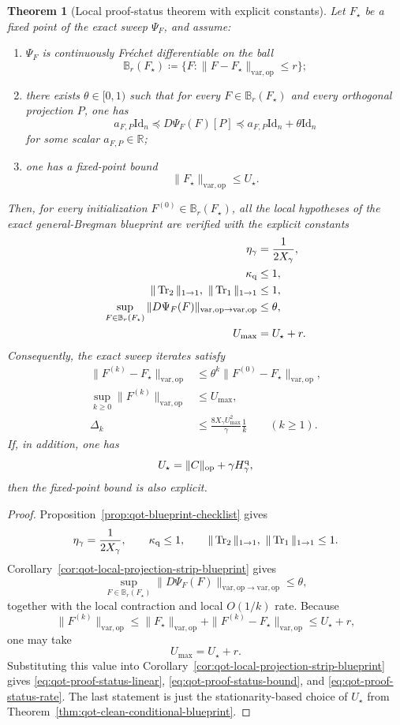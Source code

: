 \documentclass[11pt]{article}
\newcommand{\RR}{\mathbb{R}}
\newcommand{\Id}{\mathrm{Id}}
\newcommand{\Trone}{\operatorname{Tr}_{1}}
\newcommand{\Trtwo}{\operatorname{Tr}_{2}}
\newcommand{\eqdef}{\coloneqq}
\newcommand{\op}{\mathrm{op}}
\newcommand{\varop}{\mathrm{var},\op}
\theoremstyle{plain}
\newtheorem{theorem}{Theorem}[section]
\begin{document}
\begin{theorem}[Local proof-status theorem with explicit constants]
\label{thm:qot-local-proof-status}
Let $F_\star$ be a fixed point of the exact sweep $\Psi_F$, and assume:
\begin{enumerate}[label=\textnormal{(\roman*)}]
\item $\Psi_F$ is continuously Fr\'echet differentiable on the ball
\[
\mathbb B_r(F_\star)
\eqdef
\{F : \|F-F_\star\|_{\varop}\le r\};
\]
\item there exists $\theta\in[0,1)$ such that for every $F\in \mathbb B_r(F_\star)$ and every orthogonal projection $P$, one has
\[
a_{F,P}\Id_n
\preceq
D\Psi_F(F)[P]
\preceq
a_{F,P}\Id_n+\theta \Id_n
\]
for some scalar $a_{F,P}\in\RR$;
\item one has a fixed-point bound
\[
\|F_\star\|_{\varop}\le U_\star.
\]
\end{enumerate}
Then, for every initialization $F^{(0)}\in \mathbb B_r(F_\star)$, all the local hypotheses of the exact general-Bregman blueprint are verified with the explicit constants
\begin{align*}
\eta_\gamma &= \frac{1}{2X_\gamma},\\
\kappa_{\rm q} &\le 1,\\
\|\Trtwo\|_{1\to 1},\ \|\Trone\|_{1\to 1} &\le 1,\\
\sup_{F\in \mathbb B_r(F_\star)}\|D\Psi_F(F)\|_{\varop\to\varop} &\le \theta,\\
U_{\max} &= U_\star+r.
\end{align*}
Consequently, the exact sweep iterates satisfy
\begin{align}
\|F^{(k)}-F_\star\|_{\varop}
&\le
\theta^k \|F^{(0)}-F_\star\|_{\varop},
\label{eq:qot-proof-status-linear}\\
\sup_{k\ge 0}\|F^{(k)}\|_{\varop}
&\le
U_{\max},
\label{eq:qot-proof-status-bound}\\
\Delta_k
&\le
\frac{8X_\gamma U_{\max}^2}{\gamma}\frac{1}{k}
\qquad (k\ge 1).
\label{eq:qot-proof-status-rate}
\end{align}
If, in addition, one has
\[
U_\star=\|C\|_{\op}+\gamma H_\gamma^{\rm q},
\]
then the fixed-point bound is also explicit.
\end{theorem}

\begin{proof}
Proposition~\ref{prop:qot-blueprint-checklist} gives
\[
\eta_\gamma=\frac{1}{2X_\gamma},
\qquad
\kappa_{\rm q}\le 1,
\qquad
\|\Trtwo\|_{1\to 1},\ \|\Trone\|_{1\to 1}\le 1.
\]
Corollary~\ref{cor:qot-local-projection-strip-blueprint} gives
\[
\sup_{F\in \mathbb B_r(F_\star)}\|D\Psi_F(F)\|_{\varop\to\varop}\le \theta,
\]
together with the local contraction and local $O(1/k)$ rate.
Because
\[
\|F^{(k)}\|_{\varop}
\le
\|F_\star\|_{\varop}+\|F^{(k)}-F_\star\|_{\varop}
\le
U_\star+r,
\]
one may take
\[
U_{\max}=U_\star+r.
\]
Substituting this value into Corollary~\ref{cor:qot-local-projection-strip-blueprint}
gives \eqref{eq:qot-proof-status-linear}, \eqref{eq:qot-proof-status-bound}, and \eqref{eq:qot-proof-status-rate}.
The last statement is just the stationarity-based choice of $U_\star$ from
Theorem~\ref{thm:qot-clean-conditional-blueprint}.
\end{proof}
\end{document}

